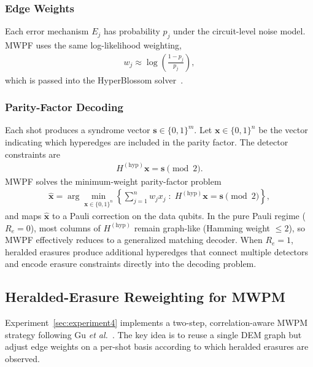 \documentclass[11pt, notitlepage, letterpaper]{article}
\begin{document}
\subsubsection*{Edge Weights}

Each error mechanism $E_j$ has probability $p_j$ under the circuit-level noise model. MWPF uses the same log-likelihood weighting,
\begin{align}
    w_j \approx \log\!\left(\frac{1 - p_j}{p_j}\right),
\end{align}
which is passed into the HyperBlossom solver~\cite{wu_minimum-weight_2025}.

\subsubsection*{Parity-Factor Decoding}

Each shot produces a syndrome vector $\mathbf{s} \in \{0,1\}^m$. Let $\mathbf{x} \in \{0,1\}^n$ be the vector indicating which hyperedges are included in the parity factor. The detector constraints are
\begin{align}
    H^{(\mathrm{hyp})} \mathbf{x} = \mathbf{s} \pmod{2}.
\end{align}
MWPF solves the minimum-weight parity-factor problem
\begin{align}
    \hat{\mathbf{x}}
    =
    \arg\min_{\mathbf{x} \in \{0,1\}^n}
    \left\{
    \sum_{j=1}^n w_j x_j
    \;:\;
    H^{(\mathrm{hyp})} \mathbf{x}
    =
    \mathbf{s}
    \pmod{2}
    \right\},
\end{align}
and maps $\hat{\mathbf{x}}$ to a Pauli correction on the data qubits. In the pure Pauli regime ($R_e = 0$), most columns of $H^{(\mathrm{hyp})}$ remain graph-like (Hamming weight $\leq 2$), so MWPF effectively reduces to a generalized matching decoder. When $R_e = 1$, heralded erasures produce additional hyperedges that connect multiple detectors and encode erasure constraints directly into the decoding problem.

\subsection{Heralded-Erasure Reweighting for MWPM}
\label{appendix:heralded-mwpm-details}

Experiment~\ref{sec:experiment4} implements a two-step, correlation-aware MWPM strategy following Gu \emph{et al.}~\cite{gu_fault-tolerant_2025}. The key idea is to reuse a single DEM graph but adjust edge weights on a per-shot basis according to which heralded erasures are observed.
\end{document}
